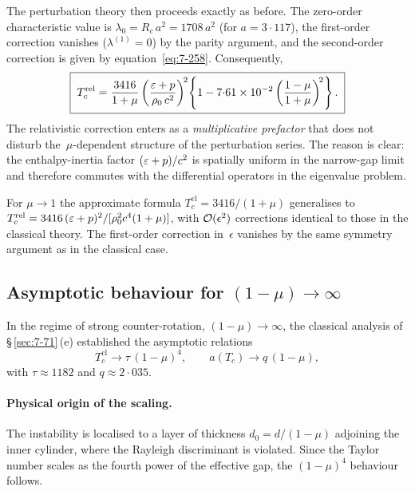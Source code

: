 The perturbation theory then proceeds exactly as before.  The
zero-order characteristic value is
$\lambda_{0} = R_{c}\,a^{2} = 1708\,a^{2}$ (for $a = 3{\cdot}117$),
the first-order correction vanishes ($\lambda^{(1)} = 0$) by the
parity argument, and the second-order correction is given by
equation~\eqref{eq:7-258}.  Consequently,
\begin{equation}
\label{eq:rel-7-263}
\boxed{\;
T_{c}^{\mathrm{rel}}
  = \frac{3416}{1+\mu}
    \left(\frac{\varepsilon+p}{\rho_0\,c^{2}}\right)^{\!2}
    \!\left\{1 - 7{\cdot}61 \times 10^{-2}
      \left(\frac{1-\mu}{1+\mu}\right)^{\!2}\right\}.
\;}
\end{equation}
The relativistic correction enters as a \emph{multiplicative
prefactor} that does not disturb the~$\mu$-dependent structure of
the perturbation series.  The reason is clear: the enthalpy-inertia
factor $(\varepsilon+p)/c^{2}$ is spatially uniform in the narrow-gap
limit and therefore commutes with the differential operators in the
eigenvalue problem.

\begin{relcorrection}
For $\mu \to 1$ the approximate formula
$T_{c}^{\mathrm{cl}} = 3416/(1+\mu)$
generalises to
$T_{c}^{\mathrm{rel}} = 3416\,(\varepsilon+p)^{2}/
[\rho_0^{2}c^{4}(1+\mu)]$,
with $\mathcal{O}(\epsilon^{2})$ corrections identical to those in the
classical theory.  The first-order correction in~$\epsilon$
vanishes by the same symmetry argument as in the classical case.
\end{relcorrection}

\subsection{Asymptotic behaviour for $(1-\mu) \to \infty$}
\label{sec:rel-71-asymptotic}

In the regime of strong counter-rotation,
$(1-\mu) \to \infty$, the classical analysis of
\S\,\ref{sec:7-71}\,(e) established the asymptotic relations
\begin{equation}
\label{eq:rel-7-264}
T_{c}^{\mathrm{cl}} \to \tau\,(1-\mu)^{4},
\qquad
a(T_{c}) \to q\,(1-\mu),
\end{equation}
with $\tau \approx 1182$ and $q \approx 2{\cdot}035$.

\paragraph{Physical origin of the scaling.}
The instability is localised to a layer of thickness
$d_{0} = d/(1-\mu)$ adjoining the inner cylinder, where the
Rayleigh discriminant is violated.  Since the Taylor number scales
as the fourth power of the effective gap, the $(1-\mu)^{4}$
behaviour follows.

